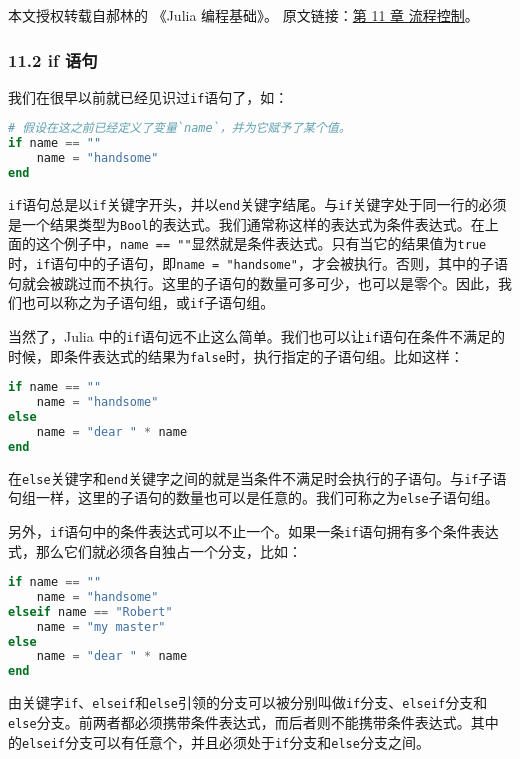 
本文授权转载自郝林的 《Julia 编程基础》。 原文链接：\href{https://github.com/hyper0x/JuliaBasics/blob/master/book/ch11.md}{第 11 章 流程控制}。

\subsubsection{11.2 if 语句}

我们在很早以前就已经见识过\verb`if`语句了，如：

\begin{lstlisting}[language=julia]
# 假设在这之前已经定义了变量`name`，并为它赋予了某个值。
if name == "" 
    name = "handsome" 
end
\end{lstlisting}

\verb`if`语句总是以\verb`if`关键字开头，并以\verb`end`关键字结尾。与\verb`if`关键字处于同一行的必须是一个结果类型为\verb`Bool`的表达式。我们通常称这样的表达式为条件表达式。在上面的这个例子中，\verb`name == ""`显然就是条件表达式。只有当它的结果值为\verb`true`时，\verb`if`语句中的子语句，即\verb`name = "handsome"`，才会被执行。否则，其中的子语句就会被跳过而不执行。这里的子语句的数量可多可少，也可以是零个。因此，我们也可以称之为子语句组，或\verb`if`子语句组。

当然了，Julia 中的\verb`if`语句远不止这么简单。我们也可以让\verb`if`语句在条件不满足的时候，即条件表达式的结果为\verb`false`时，执行指定的子语句组。比如这样：

\begin{lstlisting}[language=julia]
if name == "" 
    name = "handsome" 
else 
    name = "dear " * name
end
\end{lstlisting}

在\verb`else`关键字和\verb`end`关键字之间的就是当条件不满足时会执行的子语句。与\verb`if`子语句组一样，这里的子语句的数量也可以是任意的。我们可称之为\verb`else`子语句组。

另外，\verb`if`语句中的条件表达式可以不止一个。如果一条\verb`if`语句拥有多个条件表达式，那么它们就必须各自独占一个分支，比如：

\begin{lstlisting}[language=julia]
if name == ""
    name = "handsome"
elseif name == "Robert"
    name = "my master"
else
    name = "dear " * name
end
\end{lstlisting}

由关键字\verb`if`、\verb`elseif`和\verb`else`引领的分支可以被分别叫做\verb`if`分支、\verb`elseif`分支和\verb`else`分支。前两者都必须携带条件表达式，而后者则不能携带条件表达式。其中的\verb`elseif`分支可以有任意个，并且必须处于\verb`if`分支和\verb`else`分支之间。

